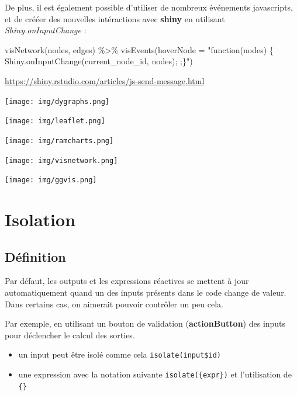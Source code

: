 \documentclass[
]{article}
\newenvironment{Shaded}{\begin{snugshade}}{\end{snugshade}}
\newcommand{\AttributeTok}[1]{\textcolor[rgb]{0.77,0.63,0.00}{#1}}
\newcommand{\FunctionTok}[1]{\textcolor[rgb]{0.00,0.00,0.00}{#1}}
\newcommand{\NormalTok}[1]{#1}
\newcommand{\SpecialCharTok}[1]{\textcolor[rgb]{0.00,0.00,0.00}{#1}}
\newcommand{\StringTok}[1]{\textcolor[rgb]{0.31,0.60,0.02}{#1}}
\begin{document}
De plus, il est également possible d'utiliser de nombreux événements
javascripts, et de crééer des nouvelles intéractions avec \textbf{shiny}
en utilisant \emph{Shiny.onInputChange} :

\begin{Shaded}
\begin{Highlighting}[]
\FunctionTok{visNetwork}\NormalTok{(nodes, edges) }\SpecialCharTok{\%\textgreater{}\%}
      \FunctionTok{visEvents}\NormalTok{(}\AttributeTok{hoverNode =} \StringTok{"function(nodes) \{}
\StringTok{        Shiny.onInputChange(\textquotesingle{}current\_node\_id\textquotesingle{}, nodes);}
\StringTok{      ;\}"}\NormalTok{)}
\end{Highlighting}
\end{Shaded}

\url{https://shiny.rstudio.com/articles/js-send-message.html}

\texttt{[image: img/dygraphs.png]}

\texttt{[image: img/leaflet.png]}

\texttt{[image: img/ramcharts.png]}

\texttt{[image: img/visnetwork.png]}

\texttt{[image: img/ggvis.png]}

\hypertarget{isolation}{%
\section{Isolation}\label{isolation}}

\hypertarget{duxe9finition}{%
\subsection{Définition}\label{duxe9finition}}

Par défaut, les outputs et les expressions réactives se mettent à jour
automatiquement quand un des inputs présents dans le code change de
valeur. Dans certains cas, on aimerait pouvoir contrôler un peu cela.

Par exemple, en utilisant un bouton de validation
(\textbf{actionButton}) des inputs pour déclencher le calcul des
sorties.

\begin{itemize}
\item
  un input peut être isolé comme cela \texttt{isolate(input\$id)}
\item
  une expression avec la notation suivante \texttt{isolate(\{expr\})} et
  l'utilisation de \texttt{\{\}}
\end{itemize}
\end{document}
